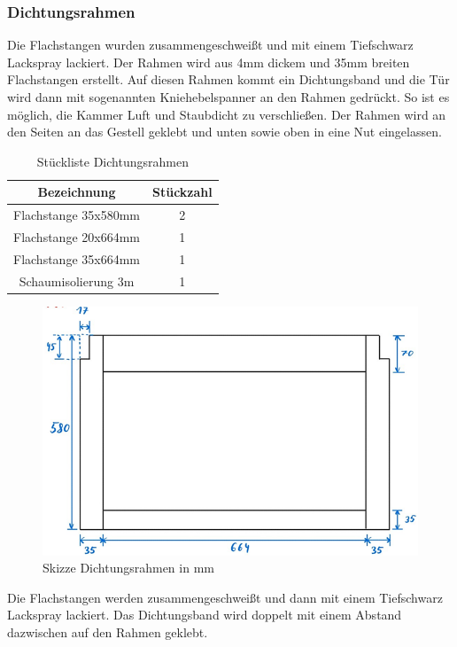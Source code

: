 
\subsubsection{Dichtungsrahmen}
Die Flachstangen wurden zusammengeschweißt und mit einem Tiefschwarz Lackspray lackiert. Der Rahmen wird aus 4mm dickem und 35mm breiten Flachstangen erstellt. Auf diesen Rahmen kommt ein Dichtungsband und die Tür wird dann mit sogenannten Kniehebelspanner an den Rahmen gedrückt. So ist es möglich, die Kammer Luft und Staubdicht zu verschließen. Der Rahmen wird an den Seiten an das Gestell geklebt und unten sowie oben in eine Nut eingelassen.
\vspace{5mm}
\begin{table}[H]
    \centering
    \begin{tabular}{ | c | c | } 
  \hline
   \textbf{Bezeichnung} & \textbf{Stückzahl}\\ 
  \hline
   Flachstange 35x580mm & 2\\ 
  \hline
   Flachstange 20x664mm & 1 \\ 
  \hline
  Flachstange 35x664mm & 1 \\ 
  \hline
  Schaumisolierung 3m & 1 \\ 
  \hline
\end{tabular}
    \caption{Stückliste Dichtungsrahmen}
\end{table}
\vspace{5mm}
\begin{figure}[H]
    \centering
    \includegraphics[scale=1.2]{image/skizzerahmen.png}
    \caption{Skizze Dichtungsrahmen in mm}
    \label{fig:enter-label}
\end{figure}
Die Flachstangen werden zusammengeschweißt und dann mit einem Tiefschwarz Lackspray lackiert. Das Dichtungsband wird doppelt mit einem Abstand dazwischen auf den Rahmen geklebt. \\
